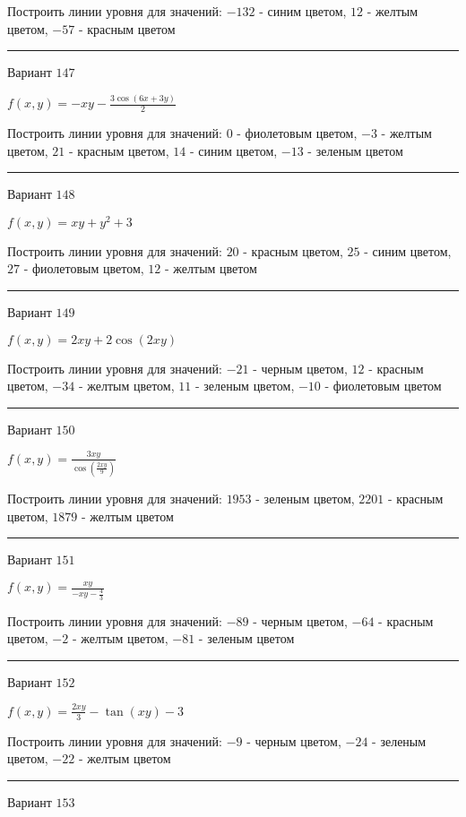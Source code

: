 \documentclass[11pt]{report}
\begin{document}
Построить линии уровня для значений: $-132$ - синим цветом, $12$ - желтым цветом, $-57$ - красным цветом
\begin{center}
\noindent\rule{8cm}{0.4pt}
\end{center}
Вариант $147$


$f(x, y) = - x y - \frac{3 \cos{\left(6 x + 3 y \right)}}{2}$

Построить линии уровня для значений: $0$ - фиолетовым цветом, $-3$ - желтым цветом, $21$ - красным цветом, $14$ - синим цветом, $-13$ - зеленым цветом
\begin{center}
\noindent\rule{8cm}{0.4pt}
\end{center}
Вариант $148$


$f(x, y) = x y + y^{2} + 3$

Построить линии уровня для значений: $20$ - красным цветом, $25$ - синим цветом, $27$ - фиолетовым цветом, $12$ - желтым цветом
\begin{center}
\noindent\rule{8cm}{0.4pt}
\end{center}
Вариант $149$


$f(x, y) = 2 x y + 2 \cos{\left(2 x y \right)}$

Построить линии уровня для значений: $-21$ - черным цветом, $12$ - красным цветом, $-34$ - желтым цветом, $11$ - зеленым цветом, $-10$ - фиолетовым цветом
\begin{center}
\noindent\rule{8cm}{0.4pt}
\end{center}
Вариант $150$


$f(x, y) = \frac{3 x y}{\cos{\left(\frac{2 x y}{9} \right)}}$

Построить линии уровня для значений: $1953$ - зеленым цветом, $2201$ - красным цветом, $1879$ - желтым цветом
\begin{center}
\noindent\rule{8cm}{0.4pt}
\end{center}
Вариант $151$


$f(x, y) = \frac{x y}{- x y - \frac{4}{3}}$

Построить линии уровня для значений: $-89$ - черным цветом, $-64$ - красным цветом, $-2$ - желтым цветом, $-81$ - зеленым цветом
\begin{center}
\noindent\rule{8cm}{0.4pt}
\end{center}
Вариант $152$


$f(x, y) = \frac{2 x y}{3} - \tan{\left(x y \right)} - 3$

Построить линии уровня для значений: $-9$ - черным цветом, $-24$ - зеленым цветом, $-22$ - желтым цветом
\begin{center}
\noindent\rule{8cm}{0.4pt}
\end{center}
Вариант $153$
\end{document}
